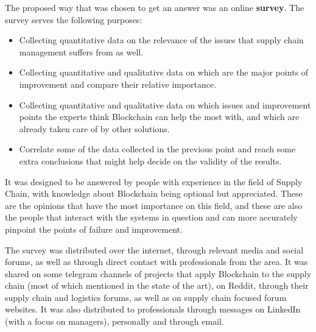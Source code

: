 The proposed way that was chosen to get an answer was an online \textbf{survey}. The survey serves the following purposes:


\begin{itemize}
\item Collecting quantitative data on the relevance of the issues that supply chain management suffers from as well. 
\item Collecting quantitative and qualitative data on which are the major points of improvement and compare their relative importance.
\item Collecting quantitative and qualitative data on which issues and improvement points the experts think Blockchain can help the most with, and which are already taken care of by other solutions.
\item Correlate some of the data collected in the previous point and reach some extra conclusions that might help decide on the validity of the results.
\end{itemize}

It was designed to be answered by people with experience in the field of Supply Chain, with knowledge about Blockchain being optional but appreciated. These are the opinions that have the most importance on this field, and these are also the people that interact with the systems in question and can more accurately pinpoint the points of failure and improvement.


The survey was distributed over the internet, through relevant media and social forums, as well as through direct contact with professionals from the area. It was shared on some telegram channels of projects that apply Blockchain to the supply chain (most of which mentioned in the state of the art), on Reddit, through their supply chain and logistics forums, as well as on supply chain focused forum websites. It was also distributed to professionals through messages on LinkedIn (with a focus on managers), personally and through email.

